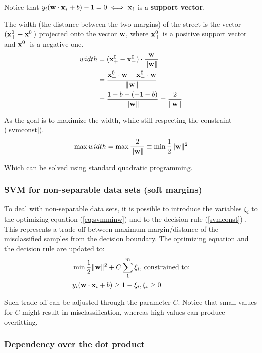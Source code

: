Notice that $y_i(\mathbf{w} \cdot \mathbf{x}_i +b) -1 = 0 \iff \mathbf{x}_i $ is a \textbf{support vector}.

The width (the distance between the two margins) of the street is the vector $(\mathbf{x}_+^0 - \mathbf{x}_-^0)$ projected onto the vector $\mathbf{w}$, where $\mathbf{x}_+^0$ is a positive support vector and $\mathbf{x}_-^0$ is a negative one.
\begin{equation} \label{eq:eqsvmwidth}
\begin{split}
width &= (\mathbf{x}_+^0 - \mathbf{x}_-^0) \cdot \frac{\mathbf{w}}{\|\mathbf{w}\|} \\
      &=\frac{\mathbf{x}_+^0 \cdot \mathbf{w} - \mathbf{x}_-^0 \cdot \mathbf{w}}{\|\mathbf{w}\|} \\
      &=\frac{1-b - (-1-b)}{\|\mathbf{w}\|} = \frac{2}{\|\mathbf{w}\|}
\end{split}
\end{equation}

As the goal is to maximize the width, while still respecting the constraint (\ref{svmconst}).
\begin{equation} \label{eq:svmminw}
	\max width = \max \frac{2}{\|\mathbf{w}\|} \equiv \min \frac{1}{2} \|\mathbf{w}\|^2
\end{equation}

Which can be solved using standard quadratic programming.

\subsubsection{SVM for non-separable data sets (soft margins)}

To deal with non-separable data sets, it is possible to introduce the variables $\xi_i$ to the optimizing equation (\ref{eq:svmminw}) and to the decision rule (\ref{svmconst}) \cite{wessvmdef}. This represents a trade-off between maximum margin/distance of the misclassified samples from the decision boundary. The optimizing equation and the decision rule are updated to:
\begin{align*}
	&\min \frac{1}{2} \|\mathbf{w}\|^2 + C \sum_{1}^{m}\xi_i \text{, constrained to:} \\
	&y_i(\mathbf{w} \cdot \mathbf{x}_i +b) \geq 1- \xi_i, \xi_i \geq 0
\end{align*}

Such trade-off can be adjusted through the parameter $C$. Notice that small values for $C$ might result in misclassification, whereas high values can produce overfitting.

\subsubsection{Dependency over the dot product}


